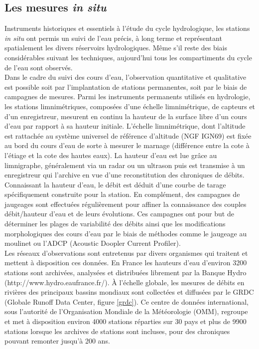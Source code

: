 \subsection{{\selectfont Les mesures \textit{in situ}}}

Instruments historiques et essentiels à l'étude du cycle hydrologique, les stations \textit{in situ} ont permis un suivi de l'eau précis, à long terme et représentant spatialement les divers réservoirs hydrologiques. Même s'il reste des biais considérables suivant les techniques, aujourd'hui tous les compartiments du cycle de l'eau sont observés.\\

Dans le cadre du suivi des cours d'eau, l'observation quantitative et qualitative est possible soit par l'implantation de stations permanentes, soit par le biais de campagnes de mesures. Parmi les instruments permanents utilisés en hydrologie, les stations limnimétriques, composées d'une échelle limnimétrique, de capteurs et d'un enregistreur, mesurent en continu la hauteur de la surface libre d'un cours d'eau par rapport à sa hauteur initiale. L'échelle limnimétrique, dont l'altitude est rattachée au système universel de référence d'altitude (NGF IGN69) est fixée au bord du cours d'eau de sorte à mesurer le marnage (différence entre la cote à l'étiage et la cote des hautes eaux). La hauteur d'eau est lue grâce au limnigraphe, généralement via un radar ou un ultrason puis est transmise à un enregistreur qui l'archive en vue d'une reconstitution des chroniques de débits. Connaissant la hauteur d'eau, le débit est déduit d'une courbe de tarage spécifiquement construite pour la station. En complément, des campagnes de jaugeages sont effectuées régulièrement pour affiner la connaissance des couples débit/hauteur d'eau et de leurs évolutions. Ces campagnes ont pour but de déterminer les plages de variabilité des débits ainsi que les modifications morphologiques des cours d'eau par le biais de méthodes comme le jaugeage au moulinet ou l'ADCP (Acoustic Doopler Current Profiler). \\
\noindent Les réseaux d'observations sont entretenus par divers organismes qui traitent et mettent à disposition ces données. En France les hauteurs d'eau d'environ 3200 stations sont archivées, analysées et distribuées librement par la Banque Hydro (http://www.hydro.eaufrance.fr/). À l'échelle globale, les mesures de débits en rivières des principaux bassins mondiaux sont collectées et diffusées par le GRDC (Globale Runoff Data Center, figure \ref{grdc}). Ce centre de données international, sous l'autorité de l'Organisation Mondiale de la Météorologie (OMM), regroupe et met à disposition environ 4000 stations réparties sur 30 pays et plus de 9900 stations lorsque les archives de stations sont incluses, pour des chroniques pouvant remonter jusqu'à 200 ans. \\

